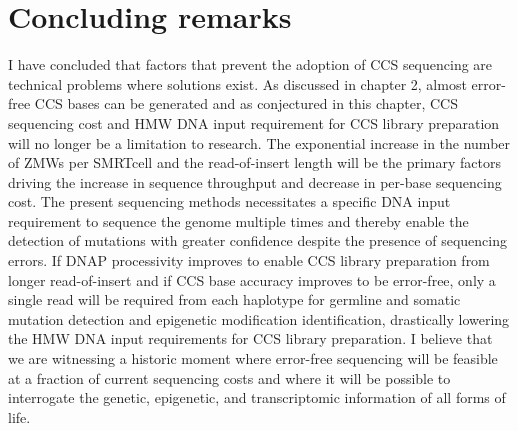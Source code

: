 \section{Concluding remarks}

I have concluded that factors that prevent the adoption of CCS sequencing are technical problems where solutions exist. As discussed in chapter 2, almost error-free CCS bases can be generated and as conjectured in this chapter, CCS sequencing cost and HMW DNA input requirement for CCS library preparation will no longer be a limitation to research. The exponential increase in the number of ZMWs per SMRTcell and the read-of-insert length will be the primary factors driving the increase in sequence throughput and decrease in per-base sequencing cost. The present sequencing methods necessitates a specific DNA input requirement to sequence the genome multiple times and thereby enable the detection of mutations with greater confidence despite the presence of sequencing errors. If DNAP processivity improves to enable CCS library preparation from longer read-of-insert and if CCS base accuracy improves to be error-free, only a single read will be required from each haplotype for germline and somatic mutation detection and epigenetic modification identification, drastically lowering the HMW DNA input requirements for CCS library preparation. I believe that we are witnessing a historic moment where error-free sequencing will be feasible at a fraction of current sequencing costs and where it will be possible to interrogate the genetic, epigenetic, and transcriptomic information of all forms of life.  









